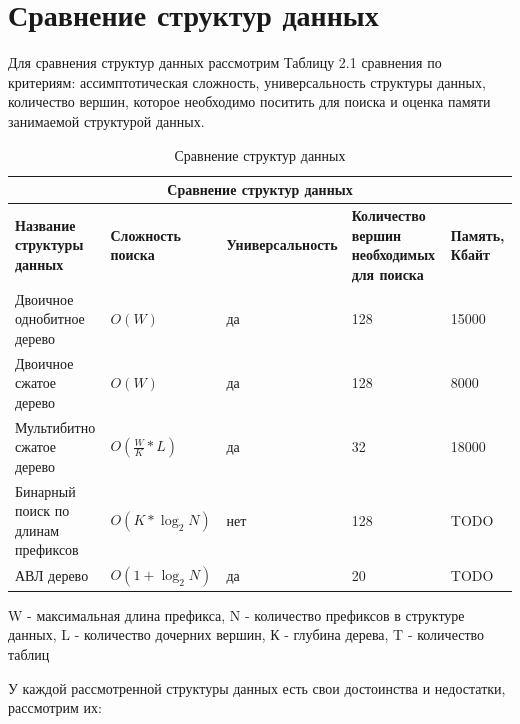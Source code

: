 \documentclass[a4peper, 12pt, titlepage, finall]{report}
\begin{document}
    \section{Сравнение структур данных}
        Для сравнения структур данных рассмотрим Таблицу 2.1 сравнения по критериям: ассимптотическая сложность, универсальность структуры данных,
        количество вершин, которое необходимо поситить для поиска и оценка памяти занимаемой структурой данных. 
        \begin{table}[ht]
            \begin{tabular}{|m{3cm} | m{2.5cm} | m{3.5cm} | m{4cm} | m{3.2cm}|}
                \hline
                \multicolumn{5}{|c|}{Сравнение структур данных}\\
                \hline
                \bf Название структуры данных     & \bf Сложность поиска & \bf Универсальность & \bf Количество вершин необходимых для поиска & \bf Память, Кбайт \\
                \hline
                Двоичное однобитное дерево & $O(W)$ & да & 128 & 15000 \\
                \hline
                Двоичное сжатое дерево & $O(W)$ & да & 128 & 8000 \\
                \hline
                Мультибитно сжатое дерево & $O(\frac{W}{K}*L)$ & да & 32 & 18000 \\
                \hline
                Бинарный поиск по длинам префиксов & $O(K*\log_2{N})$ & нет & 128 & {\ttfamily TODO} \\
                \hline
                АВЛ дерево & $O(1 + \log_2{N})$ & да & 20 & {\ttfamily TODO} \\
                \hline
            \end{tabular}
            \caption{Сравнение структур данных}
            {\ttfamily W - максимальная длина префикса, N - количество префиксов в структуре данных, L - количество дочерних вершин, К - глубина дерева, T - количество таблиц}
        \end{table}
        У каждой рассмотренной структуры данных есть свои достоинства и недостатки, рассмотрим их:
\end{document}
